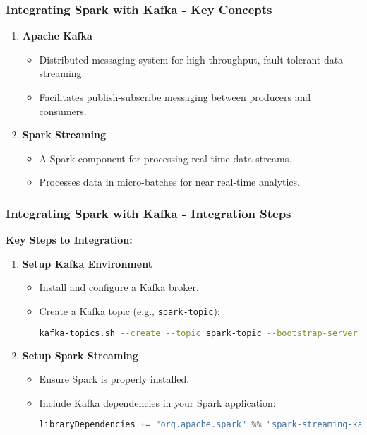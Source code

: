 \documentclass[aspectratio=169]{beamer}
\begin{document}
\begin{frame}
    \frametitle{Integrating Spark with Kafka - Key Concepts}
    \begin{enumerate}
        \item \textbf{Apache Kafka}
        \begin{itemize}
            \item Distributed messaging system for high-throughput, fault-tolerant data streaming.
            \item Facilitates publish-subscribe messaging between producers and consumers.
        \end{itemize}

        \item \textbf{Spark Streaming}
        \begin{itemize}
            \item A Spark component for processing real-time data streams.
            \item Processes data in micro-batches for near real-time analytics.
        \end{itemize}
    \end{enumerate}
\end{frame}

\begin{frame}[fragile]
    \frametitle{Integrating Spark with Kafka - Integration Steps}
    \textbf{Key Steps to Integration:}
    \begin{enumerate}
        \item \textbf{Setup Kafka Environment}
        \begin{itemize}
            \item Install and configure a Kafka broker.
            \item Create a Kafka topic (e.g., \texttt{spark-topic}):
            \begin{lstlisting}[language=bash]
kafka-topics.sh --create --topic spark-topic --bootstrap-server localhost:9092 --partitions 1 --replication-factor 1
            \end{lstlisting}
        \end{itemize}

        \item \textbf{Setup Spark Streaming}
        \begin{itemize}
            \item Ensure Spark is properly installed.
            \item Include Kafka dependencies in your Spark application:
            \begin{lstlisting}[language=scala]
libraryDependencies += "org.apache.spark" %% "spark-streaming-kafka-0-10" % "3.2.1"
            \end{lstlisting}
        \end{itemize}
    \end{enumerate}
\end{frame}
\end{document}
